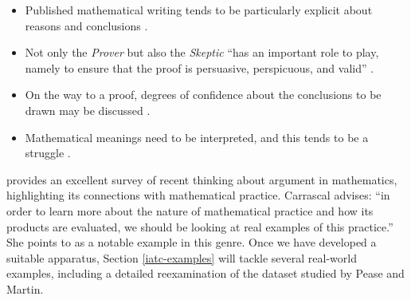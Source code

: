 \documentclass[smallextended,oneside]{svjour3}       %
\let\cite\citep
\newcommand\nothing[1]{#1}
\let\paragraph\nothing
\begin{document}
\begin{itemize}
\item Published mathematical writing tends to be particularly explicit about
reasons and conclusions \cite[p.~149]{dove2009towards}.
\item 
Not only the \emph{Prover} but also the \emph{Skeptic}
``has an important role to play, namely to ensure that the proof is persuasive, perspicuous, and valid'' \cite[p.~2618]{novaes2016reductio}.
\item On the way to a proof, degrees of
  confidence about the conclusions to be drawn may be discussed \cite[p.~17]{inglis2007modelling}.
\item Mathematical meanings need to be interpreted, and this tends to be a struggle  \cite[p.~360]{vanOers}.
\end{itemize}

\paragraph{\citet{Carrascal2015} provides an excellent survey of recent thinking about argument in mathematics, highlighting its connections with mathematical practice.}
Carrascal advises: ``in
order to learn more about the nature of mathematical practice and how
its products are evaluated, we should be looking at real examples of
this practice.''  She points to \citet{pease-and-martin} as a notable
example in this genre.  Once we have developed a suitable apparatus,
Section \ref{iatc-examples} will tackle several
real-world examples, including a detailed reexamination of the
dataset studied by Pease and Martin.


\end{document}
